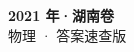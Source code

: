 \documentclass[zihao=-4, a4paper]{ctexart}
\begin{document}
\begin{center}
  {\Large\bfseries 2021 年·湖南卷}\\[4pt]
  {\large 物理 · 答案速查版}
\end{center}
\medskip
{}

\clearpage
{}

\end{document}
